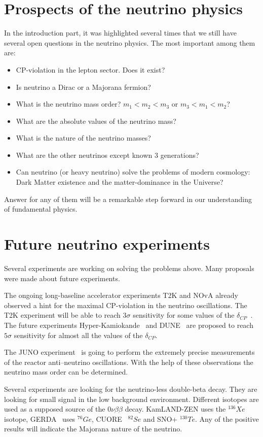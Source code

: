 \documentclass[../main.tex]{subfiles}
\begin{document}
\section{Prospects of the neutrino physics}
In the introduction part, it was highlighted several times that we still have several open questions in the neutrino physics. The most important among them are:
\begin{itemize}
  \item CP-violation in the lepton sector. Does it exist?
  \item Is neutrino a Dirac or a Majorana fermion?
  \item What is the neutrino mass order? $m_1<m_2<m_3$ or $m_3<m_1<m_2$?
  \item What are the absolute values of the neutrino mass?
  \item What is the nature of the neutrino masses?
  \item What are the other neutrinos except known 3 generations?
  \item Can neutrino (or heavy neutrino) solve the problems of modern cosmology: Dark Matter existence and the matter-dominance in the Universe?
\end{itemize}

Answer for any of them will be a remarkable step forward in our understanding of fundamental physics.

\section{Future neutrino experiments}
\label{intro:future}
Several experiments are working on solving the problems above. Many proposals were made about future experiments.

The ongoing long-baseline accelerator experiments T2K and NOvA already observed a hint for the maximal CP-violation in the neutrino oscillations. The T2K experiment will be able to reach $3\sigma$ sensitivity for some values of the $\delta_{CP}$~\cite{Abe2016e}. The future experiments Hyper-Kamiokande~\cite{Proto-Collaboration2018} and DUNE~\cite{Acciarri2016} are proposed to reach $5\sigma$ sensitivity for almost all the values of the $\delta_{CP}$.

The JUNO experiment~\cite{Cerna2020} is going to perform the extremely precise measurements of the reactor anti--neutrino oscillations. With the help of these observations the neutrino mass order can be determined.

Several experiments are looking for the neutrino-less double-beta decay. They are looking for small signal in the low background environment. Different isotopes are used as a supposed source of the $0\nu\beta\beta$ decay. KamLAND-ZEN uses the ${}^{136}Xe$ isotope, GERDA~\cite{DiMarco2020} uses ${}^{76}Ge$, CUORE~\cite{Cardani2020} ${}^{82}Se$ and SNO+ ${}^{130}Te$. Any of the positive results will indicate the Majorana nature of the neutrino.
\end{document}
